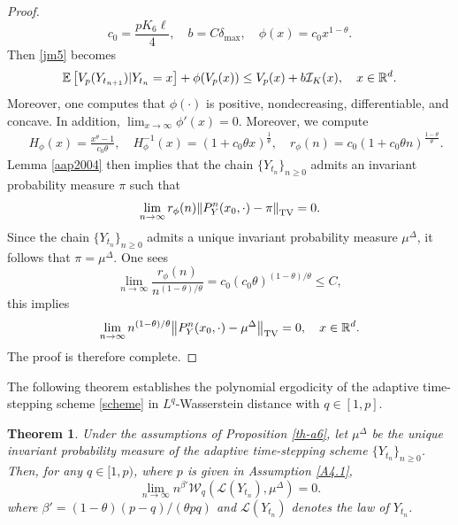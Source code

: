 \documentclass[preprint,12pt,compress]{elsarticle}
\newtheorem{theorem}{Theorem}[section] %
\begin{document}
\begin{proof}
\begin{equation*}
	c_0 =\frac{{p{K_6}\ell }}{4}, \quad b = C\delta_{\max}, \quad \phi (x) = c_0{x^{1 - \theta }}.
\end{equation*}
Then \eqref{jm5} becomes
\begin{equation*}
	\mathbb{E}\left[ {{V_p}({Y_{{t_{n + 1}}}})|{Y_{{t_n}}} = x} \right] + \phi ({V_p}(x)) \le {V_p}(x) + b{{\cal I}_K}(x), \quad x \in \mathbb{R}^d.
\end{equation*}
Moreover, one computes that $\phi(\cdot)$ is positive, nondecreasing, differentiable, and concave. In addition, ${\lim _{x \to \infty }}\phi '(x) = 0$. Moreover, we compute
\begin{equation*}
\begin{split}
	\quad {H_\phi }(x) = \frac{{{x^\theta } - 1}}{c_0 \theta }, \quad H_\phi ^{ - 1}(x) = {\left( {1+c_0 \theta x} \right)^{\frac{1}{\theta }}}, \quad 
	 {r_\phi }(n) = c_0{\left( {1+c_0 \theta n} \right)^{\frac{{1 - \theta }}{\theta }}}.
\end{split}
\end{equation*}
Lemma \ref{aap2004} then implies that the chain ${\{ {Y_{{t_n}}}\} _{n \ge 0}}$ admits an invariant probability measure $\pi$ such that 
\begin{equation*}
	\mathop {\lim }\limits_{n \to \infty } {r_\phi }(n){\left\| {P_Y^n({x_0}, \cdot ) - \pi} \right\|_{{\rm{TV}}}} = 0 .
\end{equation*}
Since the chain ${\{ {Y_{{t_n}}}\} _{n \ge 0}}$ admits a unique invariant probability measure $\mu^\Delta$, it follows that $ \pi = \mu^\Delta$.
One sees
\begin{equation*}
	\mathop {\lim }\limits_{n \to \infty } \frac{{{r_\phi }(n)}}{{{n^{(1 - \theta )/\theta }}}} = {c_0}{({c_0}\theta )^{(1 - \theta )/\theta }} \le C,
\end{equation*}
this implies
\begin{equation*}
	\mathop {\lim }\limits_{n \to \infty } {n^{ (1 - \theta )/\theta}}{\left\| {P_Y^n({x_0}, \cdot ) - {\mu ^\Delta }} \right\|_{{\rm{TV}}}} = 0, \quad x \in \mathbb{R}^d.
\end{equation*}
The proof is therefore complete.
\end{proof}

The following theorem establishes the polynomial ergodicity of the adaptive time-stepping scheme \eqref{scheme} in $L^q$-Wasserstein distance with $q \in [1, p]$.

\begin{theorem}  \label{th-a7}
Under the assumptions of Proposition \ref{th-a6}, let $\mu^\Delta$ be the unique invariant probability measure of the adaptive time-stepping scheme
$\{Y_{t_n}\}_{n\ge0}$. Then, for any $q \in [1,p)$, where $p$ is given in Assumption \ref{A4.1}, 
\begin{equation*}
	\mathop {\lim }\limits_{n \to \infty } {n^{\beta '}}{\mathcal{W}_q}(\mathcal{L}({Y_{{t_n}}}),{\mu ^\Delta }) = 0 .
\end{equation*}
where $\beta' = (1-\theta)(p-q)/(\theta pq)$ and $\mathcal{L}({Y_{{t_n}}})$ denotes the law of $Y_{t_n}$.	
\end{theorem}
\end{document}
